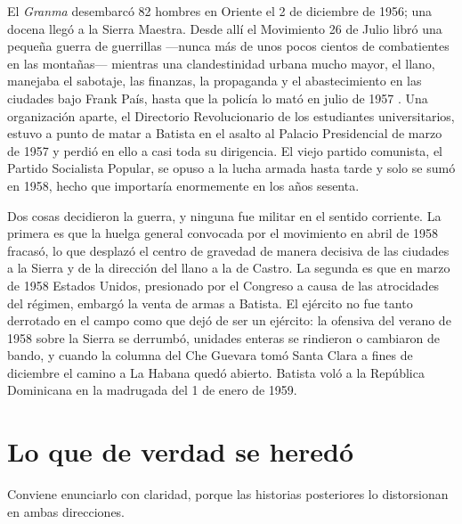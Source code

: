 El \emph{Granma} desembarcó 82 hombres en Oriente el 2 de diciembre de 1956; una
docena llegó a la Sierra Maestra. Desde allí el Movimiento 26 de Julio libró una
pequeña guerra de guerrillas ---nunca más de unos pocos cientos de combatientes
en las montañas--- mientras una clandestinidad urbana mucho mayor, el llano,
manejaba el sabotaje, las finanzas, la propaganda y el abastecimiento en las
ciudades bajo Frank País, hasta que la policía lo mató en julio de 1957
\citep{sweig2002}. Una organización aparte, el Directorio Revolucionario de los
estudiantes universitarios, estuvo a punto de matar a Batista en el asalto al
Palacio Presidencial de marzo de 1957 y perdió en ello a casi toda su dirigencia.
El viejo partido comunista, el Partido Socialista Popular, se opuso a la lucha
armada hasta tarde y solo se sumó en 1958, hecho que importaría enormemente en
los años sesenta.

Dos cosas decidieron la guerra, y ninguna fue militar en el sentido corriente. La
primera es que la huelga general convocada por el movimiento en abril de 1958
fracasó, lo que desplazó el centro de gravedad de manera decisiva de las ciudades
a la Sierra y de la dirección del llano a la de Castro. La segunda es que en
marzo de 1958 Estados Unidos, presionado por el Congreso a causa de las
atrocidades del régimen, embargó la venta de armas a Batista. El ejército no fue
tanto derrotado en el campo como que dejó de ser un ejército: la ofensiva del
verano de 1958 sobre la Sierra se derrumbó, unidades enteras se rindieron o
cambiaron de bando, y cuando la columna del Che Guevara tomó Santa Clara a fines
de diciembre el camino a La Habana quedó abierto. Batista voló a la República
Dominicana en la madrugada del 1 de enero de 1959.

\section{Lo que de verdad se heredó}

Conviene enunciarlo con claridad, porque las historias posteriores lo distorsionan
en ambas direcciones.

